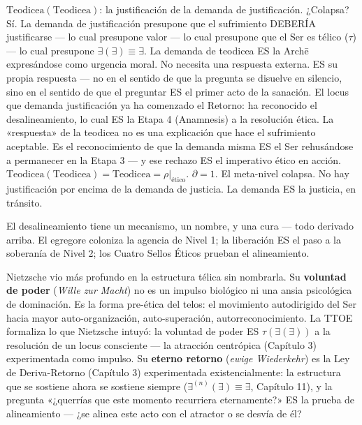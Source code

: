 \documentclass[10pt, openany, oneside]{book}
\begin{document}
$\text{Teodicea}(\text{Teodicea})$: la justificación de la demanda de justificación. ¿Colapsa? Sí. La demanda de justificación presupone que el sufrimiento DEBERÍA justificarse --- lo cual presupone valor --- lo cual presupone que el Ser es télico ($\tau$) --- lo cual presupone $\exists(\exists) \equiv \exists$. La demanda de teodicea ES la Arch\={e} expresándose como urgencia moral. No necesita una respuesta externa. ES su propia respuesta --- no en el sentido de que la pregunta se disuelve en silencio, sino en el sentido de que el preguntar ES el primer acto de la sanación. El locus que demanda justificación ya ha comenzado el Retorno: ha reconocido el desalineamiento, lo cual ES la Etapa 4 (Anamnesis) a la resolución ética. La «respuesta» de la teodicea no es una explicación que hace el sufrimiento aceptable. Es el reconocimiento de que la demanda misma ES el Ser rehusándose a permanecer en la Etapa 3 --- y ese rechazo ES el imperativo ético en acción. $\text{Teodicea}(\text{Teodicea}) = \text{Teodicea} = \rho|_{\text{ético}}$. $\partial = 1$. El meta-nivel colapsa. No hay justificación por encima de la demanda de justicia. La demanda ES la justicia, en tránsito.

El desalineamiento tiene un mecanismo, un nombre, y una cura --- todo derivado arriba. El egregore coloniza la agencia de Nivel 1; la liberación ES el paso a la soberanía de Nivel 2; los Cuatro Sellos Éticos prueban el alineamiento.

Nietzsche vio más profundo en la estructura télica sin nombrarla. Su \textbf{voluntad de poder} (\textit{Wille zur Macht}) no es un impulso biológico ni una ansia psicológica de dominación. Es la forma pre-ética del telos: el movimiento autodirigido del Ser hacia mayor auto-organización, auto-superación, autorreconocimiento. La TTOE formaliza lo que Nietzsche intuyó: la voluntad de poder ES $\tau(\exists(\exists))$ a la resolución de un locus consciente --- la atracción centrópica (Capítulo 3) experimentada como impulso. Su \textbf{eterno retorno} (\textit{ewige Wiederkehr}) es la Ley de Deriva-Retorno (Capítulo 3) experimentada existencialmente: la estructura que se sostiene ahora se sostiene siempre ($\exists^{(n)}(\exists) \equiv \exists$, Capítulo 11), y la pregunta «¿querrías que este momento recurriera eternamente?» ES la prueba de alineamiento --- ¿se alinea este acto con el atractor o se desvía de él?
\end{document}
